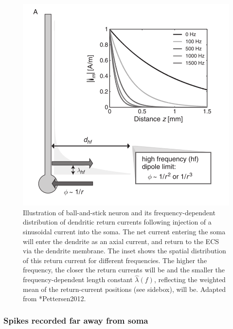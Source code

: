 \begin{figure}[!ht]
\begin{center}
\includegraphics{Figures/Spikes/Spikes-ball-and-stick-sketch-w70-r300}
\end{center}
\caption[]{Illustration of ball-and-stick neuron and its frequency-dependent 
distribution of dendritic return currents following injection of a sinusoidal current into the soma.
The net current entering the soma will enter the dendrite as an axial current, and return to the 
ECS via the dendrite membrane. The inset shows the spatial distribution of this return current
for different frequencies. The higher the frequency, the closer the return currents will be and
the smaller the frequency-dependent length constant $\hat{\lambda}(f)$, reflecting the weighted mean 
of the return-current positions (see sidebox), will be. 
 Adapted from \citeasnoun**{Pettersen2012}.
}
\label{Spikes:fig:ball-and-stick-sketch}
\end{figure}
%


\subsubsection{Spikes recorded far away from soma}
\label{Spikes:sec:far-spikes}


